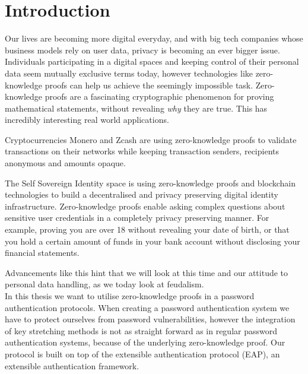 

\section{Introduction} %
%

Our lives are becoming more digital everyday, and with big tech companies whose business models rely on user data, privacy is becoming an ever bigger issue.
Individuals participating in a digital spaces and keeping control of their personal data seem mutually exclusive terms today, however technologies like zero-knowledge proofs can help us achieve the seemingly impossible task.
Zero-knowledge proofs are a fascinating cryptographic phenomenon for proving mathematical statements, without revealing \textit{why} they are true. This has incredibly interesting real world applications.

Cryptocurrencies Monero and Zcash are using zero-knowledge proofs to validate transactions on their networks while keeping transaction senders, recipients anonymous and amounts opaque.

The Self Sovereign Identity space is using zero-knowledge proofs and blockchain technologies to build a decentralised and privacy preserving digital identity infrastructure.
Zero-knowledge proofs enable asking complex questions about sensitive user credentials in a completely privacy preserving manner.
For example, proving you are over 18 without revealing your date of birth, or that you hold a certain amount of funds in your bank account without disclosing your financial statements.

Advancements like this hint that we will look at this time and our attitude to personal data handling, as we today look at feudalism.
\bigskip
\\
In this thesis we want to utilise zero-knowledge proofs in a password authentication protocols.
When creating a password authentication system we have to protect ourselves from password vulnerabilities, however the integration of key stretching methods is not as straight forward as in regular password authentication systems, because of the underlying zero-knowledge proof.
Our protocol is built on top of the extensible authentication protocol (EAP), an extensible authentication framework.


